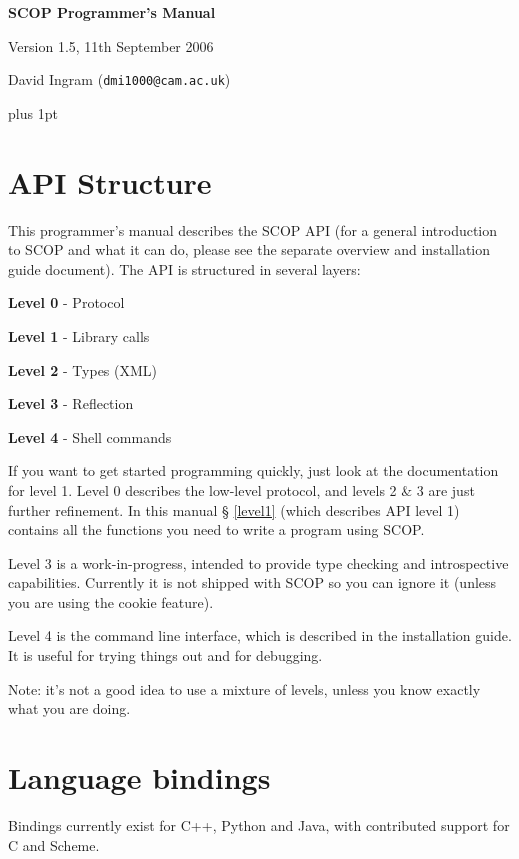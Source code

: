 \documentclass[12pt,a4paper,twoside]{article}
\renewcommand{\_}{\texttt{\symbol{95}}}
\begin{document}
\centerline{\textbf{\LARGE SCOP Programmer's Manual}}
\vspace{0.5cm}
\centerline{Version 1.5, 11th September 2006}
\centerline{David Ingram (\texttt{dmi1000@cam.ac.uk})}

{ \parskip 1mm plus 1pt \tableofcontents }

\section{API Structure}

This programmer's manual describes the SCOP API (for a general
introduction to SCOP and what it can do, please see the separate
overview and installation guide document). The API is structured in
several layers:

\begin{bulletlist}
\item \textbf{Level 0} - Protocol
\item \textbf{Level 1} - Library calls
\item \textbf{Level 2} - Types (XML)
\item \textbf{Level 3} - Reflection
\item \textbf{Level 4} - Shell commands
\end{bulletlist}

If you want to get started programming quickly, just look at the
documentation for level 1. Level 0 describes the low-level protocol,
and levels 2 \& 3 are just further refinement. In this manual \S
\ref{level1} (which describes API level 1) contains all the functions
you need to write a program using SCOP.

Level 3 is a work-in-progress, intended to provide type checking and
introspective capabilities. Currently it is not shipped with SCOP so
you can ignore it (unless you are using the cookie feature).

Level 4 is the command line interface, which is described in the
installation guide. It is useful for trying things out and for
debugging.

Note: it's not a good idea to use a mixture of levels, unless you
know exactly what you are doing.

\section{Language bindings}

Bindings currently exist for C++, Python and Java, with contributed
support for C and Scheme.
\end{document}
